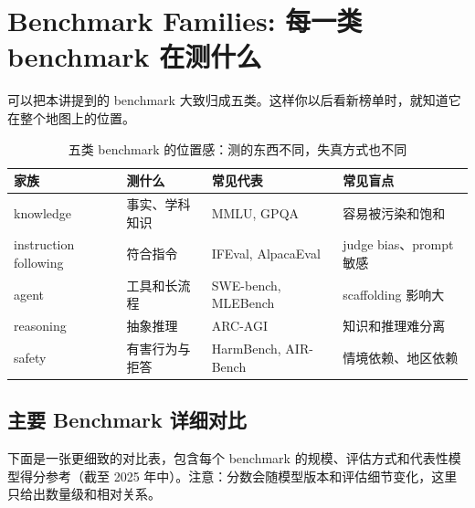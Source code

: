 \section{Benchmark Families: 每一类 benchmark 在测什么}

可以把本讲提到的 benchmark 大致归成五类。这样你以后看新榜单时，就知道它在整个地图上的位置。

\begin{table}[H]
\centering
\begin{tabular}{p{2.6cm}p{3.7cm}p{4.1cm}p{3.0cm}}
\toprule
\textbf{家族} & \textbf{测什么} & \textbf{常见代表} & \textbf{常见盲点} \\
\midrule
knowledge & 事实、学科知识 & MMLU, GPQA & 容易被污染和饱和 \\
instruction following & 符合指令 & IFEval, AlpacaEval & judge bias、prompt 敏感 \\
agent & 工具和长流程 & SWE-bench, MLEBench & scaffolding 影响大 \\
reasoning & 抽象推理 & ARC-AGI & 知识和推理难分离 \\
safety & 有害行为与拒答 & HarmBench, AIR-Bench & 情境依赖、地区依赖 \\
\bottomrule
\end{tabular}
\caption{五类 benchmark 的位置感：测的东西不同，失真方式也不同}
\end{table}

\subsection{主要 Benchmark 详细对比}

下面是一张更细致的对比表，包含每个 benchmark 的规模、评估方式和代表性模型得分参考（截至 2025 年中）。注意：分数会随模型版本和评估细节变化，这里只给出数量级和相对关系。

